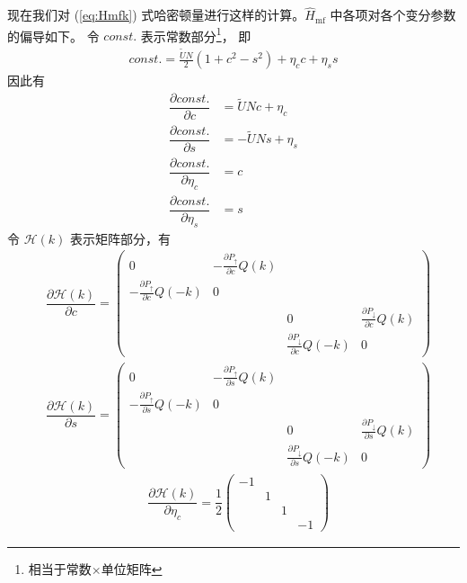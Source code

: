 现在我们对 (\ref{eq:Hmfk}) 式哈密顿量进行这样的计算。$\hat{H}_{\text{mf}}$ 中各项对各个变分参数的偏导如下。
令 $const.$ 表示常数部分\footnote{相当于常数$\times$单位矩阵}，
即 
\begin{align}
const. = \frac{\tilde{U}N}{2}(1+c^2-s^2) + \eta_cc+\eta_ss
\end{align}
因此有
\begin{align}
\dfrac{\partial const.}{\partial c} &= \tilde{U}Nc+\eta_c \\
\dfrac{\partial const.}{\partial s} &= -\tilde{U}Ns+\eta_s \\
\dfrac{\partial const.}{\partial \eta_c} &= c \\
\dfrac{\partial const.}{\partial \eta_s} &= s 
\end{align}
令 $\mathcal{H}(k)$ 表示矩阵部分，有
\begin{align}
    & \dfrac{\partial\mathcal{H}(k)}{\partial c}=
        \begin{pmatrix}
            0 & -\frac{\partial P_{\uparrow}}{\partial c}Q(k) & & \\
            -\frac{\partial P_{\uparrow}}{\partial c}Q(-k) & 0 & & \\
            & & 0 & \frac{\partial P_{\downarrow}}{\partial c}Q(k) \\
            & & \frac{\partial P_{\downarrow}}{\partial c}Q(-k) & 0 
        \end{pmatrix}
\end{align}
\begin{align}
    & \dfrac{\partial\mathcal{H}(k)}{\partial s}=
        \begin{pmatrix}
            0 & -\frac{\partial P_{\uparrow}}{\partial s}Q(k) & & \\
            -\frac{\partial P_{\uparrow}}{\partial s}Q(-k) & 0 & & \\
            & & 0 & \frac{\partial P_{\downarrow}}{\partial s}Q(k) \\
            & & \frac{\partial P_{\downarrow}}{\partial s}Q(-k) & 0 
        \end{pmatrix}
\end{align}
\begin{align}
    & \dfrac{\partial\mathcal{H}(k)}{\partial \eta_c}=\dfrac{1}{2}
        \begin{pmatrix}
            -1 & & & \\
            & 1 & & \\
            & & 1 & \\
            & & & -1 
        \end{pmatrix}
\end{align}
